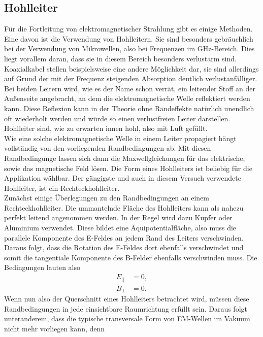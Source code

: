 \subsection{Hohlleiter}
Für die Fortleitung von elektromagnetischer Strahlung gibt es einige Methoden. Eine davon ist die Verwendung von Hohlleitern. Sie sind besonders gebräuchlich bei der Verwendung von Mikrowellen, also bei Frequenzen im $\si{\giga\hertz}$-Bereich.
Dies liegt vorallem daran, dass sie in diesem Bereich besonders verlustarm sind. Koaxialkabel stellen beispielsweise eine andere Möglichkeit dar, sie sind allerdings auf Grund der mit der Frequenz steigenden Absorption deutlich 
verlustanfälliger. Bei beiden Leitern wird, wie es der Name schon verrät, ein leitender Stoff an der Außenseite angebracht, an dem die elektromagnetische Welle reflektiert werden kann. Diese Reflexion kann in der Theorie ohne Randeffekte natürlich unendlich oft
wiederholt werden und würde so einen verlustfreien Leiter darstellen. Hohlleiter sind, wie zu erwarten innen hohl, also mit Luft gefüllt.
\\
\newline
Wie eine solche elektromagnetische Welle in einem Leiter propagiert hängt vollständig von den vorliegenden Randbedingungen ab. Mit diesen Randbedingunge lassen sich dann die Maxwellgleichungen für das elektrische, sowie das magnetische Feld lösen.
Die Form eines Hohlleiters ist beliebig für die Applikation wählbar. Der gängigste und auch in diesem Versuch verwendete Hohlleiter, ist ein Rechteckhohlleiter. 
\\
\newline
Zunächst einige Überlegungen zu den Randbedingungen an einem Rechteckhohlleiter. Die ummantelnde Fläche des Hohlleiters kann als nahezu perfekt leitend angenommen werden. In der Regel wird dazu Kupfer oder Aluminium verwendet. Diese bildet eine 
Äquipotentialfläche, also muss die parallele Komponente des E-Feldes an jedem Rand des Leiters verschwinden. Daraus folgt, dass die Rotation des E-Feldes dort ebenfalls verschwindet und somit die tangentiale Komponente des B-Felder ebenfalls
verschwinden muss. Die Bedingungen lauten also
\begin{align*}
E_{||} &= 0, \\
B_{⊥} &= 0.
\end{align*}
Wenn nun also der Querschnitt eines Hohlleiters betrachtet wird, müssen diese Randbedingungen in jede einsichtbare Raumrichtung erfüllt sein. Daraus folgt unteranderem, dass die typische transversale Form von EM-Wellen im Vakuum nicht mehr vorliegen kann, denn
